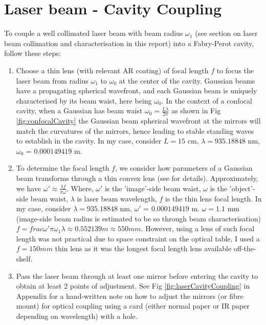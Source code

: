 \documentclass[12pt]{report}
\begin{document}
\section{Laser beam - Cavity Coupling}
To couple a well collimated laser beam with beam radius $\omega_1$ (see section on laser beam collimation and characterisation in this report) into a Fabry-Perot cavity, follow these steps: 
\begin{enumerate}
    \item Choose a thin lens (with relevant AR coating) of focal length $f$ to focus the laser beam from radius $\omega_1$ to $\omega_0$ at the center of the cavity. Gaussian beams have a propagating spherical wavefront, and each Gaussian beam is uniquely characterised by its beam waist, here being $\omega_0$. In the context of a confocal cavity, when a Gaussian has beam waist $\omega_0 = \frac{L\lambda}{2\pi}$ as shown in Fig \ref{fig:confocalCavity} the Gaussian beam spherical wavefront at the mirrors will match the curvatures of the mirrors, hence leading to stable standing waves to establish in the cavity. In my case, consider $L=15$ cm, $\lambda = 935.18848$ nm,  $\omega_0$ = $0.000149419$ m.
    
    \item To determine the focal length $f$, we consider how parameters of a Gaussian beam transforms through a thin convex lens (see \cite{principleOfLasersOrazio} for details). Approximately, we have $\omega' \approx \frac{\lambda f}{\pi \omega}$. Where, $\omega'$ is the 'image'-side beam waist, $\omega$ is the 'object'-side beam waist, $\lambda$ is laser beam wavelength, $f$ is the thin lens focal length. In my case, consider $\lambda = 935.18848$ nm, $\omega'$ = $0.000149419$ m. $\omega = 1.1$ mm (image-side beam radius is estimated to be so through beam characterisation) $f = frac{\omega' \pi \omega_1}{\lambda} \approx 0.552139m \approx 550mm$. However, using a lens of such focal length was not practical due to space constraint on the optical table, I used a $f=150mm$ thin lens as it was the longest focal length lens available off-the-shelf. 
    
    \item Pass the laser beam through at least one mirror before entering the cavity to obtain at least 2 points of adjustment. See Fig \ref{fig:laserCavityCoupling} in Appendix for a hand-written note on how to adjust the mirrors (or fibre mount) for optical coupling using a card (either normal paper or IR paper depending on wavelength) with a hole. 


\end{enumerate}
\end{document}
